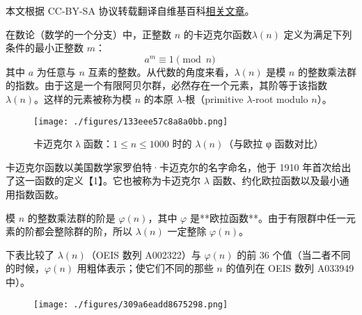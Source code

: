 
本文根据 CC-BY-SA 协议转载翻译自维基百科\href{https://en.wikipedia.org/wiki/Carmichael_function}{相关文章}。

在数论（数学的一个分支）中，正整数 $n$ 的卡迈克尔函数$\lambda(n)$ 定义为满足下列条件的最小正整数 $m$：
$$
a^{m} \equiv 1 \pmod{n}~
$$
其中 $a$ 为任意与 $n$ 互素的整数。从代数的角度来看，$\lambda(n)$ 是模 $n$ 的整数乘法群的指数。由于这是一个有限阿贝尔群，必然存在一个元素，其阶等于该指数 $\lambda(n)$。这样的元素被称为模 $n$ 的本原 $\lambda$-根（primitive $\lambda$-root modulo $n$）。
\begin{figure}[ht]
\centering
\texttt{[image: ./figures/133eee57c8a8a0bb.png]}
\caption{卡迈克尔 λ 函数：$1 \le n \le 1000$ 时的 $\lambda(n)$（与欧拉 φ 函数对比）} \label{fig_KMKRhs_1}
\end{figure}
卡迈克尔函数以美国数学家罗伯特·卡迈克尔的名字命名，他于 1910 年首次给出了这一函数的定义【1】。它也被称为卡迈克尔 $\lambda$ 函数、约化欧拉函数以及最小通用指数函数。

模 $n$ 的整数乘法群的阶是 $\varphi(n)$，其中 $\varphi$ 是**欧拉函数**。由于有限群中任一元素的阶都会整除群的阶，所以 $\lambda(n)$ 一定整除 $\varphi(n)$。

下表比较了 $\lambda(n)$（OEIS 数列 A002322）与 $\varphi(n)$ 的前 36 个值（当二者不同的时候，$\varphi(n)$ 用粗体表示；使它们不同的那些 $n$ 的值列在 OEIS 数列 A033949 中）。
\begin{figure}[ht]
\centering
\texttt{[image: ./figures/309a6eadd8675298.png]}
\caption{} \label{fig_KMKRhs_2}
\end{figure}
